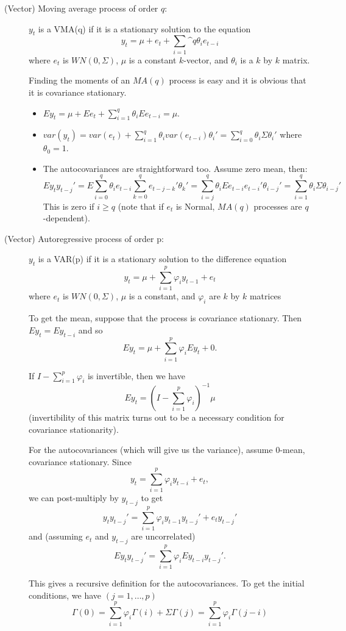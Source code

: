 \begin{description}
\item[(Vector) Moving average process of order $q$:]

  $y_t$ is a VMA(q) if it is a stationary solution to the equation
  \[y_t = μ + e_t + \sum_{i=1}\^q θ_i e_{t-i}\] where $e_t$ is $WN(0,
  Σ)$, $μ$ is a constant $k$-vector, and $θ_i$ is a $k$ by $k$ matrix.

  Finding the moments of an $MA(q)$ process is easy and it is obvious
  that it is covariance stationary.

  \begin{itemize}
  \item $E y_t = μ + E e_t + \sum_{i=1}^q θ_i E e_{t-i} = μ$.
  \item $var(y_t) = var(e_t) + \sum_{i=1}^q θ_i var(e_{t-i}) θ_i' =
    \sum_{i=0}^q θ_i Σ θ_i'$ where $θ_0 = 1$.
  \item The autocovariances are straightforward too. Assume zero mean,
    then: 
    \[E y_t y_{t-j}' = E \sum_{i=0}^q θ_i e_{t-i} \sum_{k=0}^q e_{t-j-k}' θ_k' 
    = \sum_{i=j}^q θ_i E e_{t-i} e_{t-i}' θ_{i-j}'
    = \sum_{i=1}^q θ_i Σ θ_{i-j}'\] 
    This is zero if $i ≥ q$ (note that if $e_t$ is Normal, $MA(q)$
    processes are $q$-dependent).
  \end{itemize}
\item[(Vector) Autoregressive process of order p:]
  $y_t$ is a VAR(p) if it is a stationary solution to the difference
  equation 
  \[y_t = μ + \sum_{i=1}^p φ_i y_{t-1} + e_t\]
  where $e_t$ is $WN(0, Σ)$, $μ$ is a constant, and $φ_i$ are $k$ by
  $k$ matrices

  To get the mean, suppose that the process is covariance
  stationary. Then $E y_t = E y_{t-i}$ and so
  \[E y_t = μ + \sum_{i=1}^p φ_i E y_t + 0.\]

  If $I - \sum_{i=1}^p φ_i$ is invertible, then we have
  \[E y_t = (I - \sum_{i=1}^p φ_i )^{-1} μ\]
  (invertibility of this matrix turns out to be a necessary condition
  for covariance stationarity).

  For the autocovariances (which will give us the variance), assume
  0-mean, covariance stationary. Since
  \[y_t = \sum_{i=1}^p φ_i y_{t-i} + e_t,\]
  we can post-multiply by $y_{t-j}$ to get
  \[y_t y_{t-j}' = \sum_{i=1}^p φ_i y_{t-1} y_{t-j}' + e_t y_{t-j}'\]
  and (assuming $e_t$ and $y_{t-j}$ are uncorrelated)
  \[E y_t y_{t-j}' = \sum_{i=1}^p φ_i E y_{t-i} y_{t-j}'.\]

  This gives a recursive definition for the autocovariances. To get
  the initial conditions, we have $(j = 1,…,p)$
  \[Γ(0) = \sum_{i=1}^p φ_i Γ(i) + Σ Γ(j) = \sum_{i=1}^p φ_i Γ(j-i) \]


\end{description}
